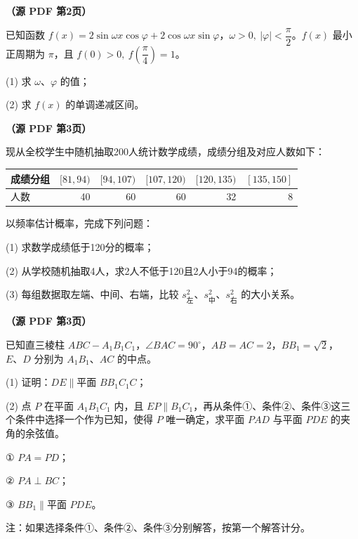 \begin{question}
\textbf{（源 PDF 第2页）} 

已知函数 \(f(x)=2\sin\omega x\cos\varphi+2\cos\omega x\sin\varphi\)，\(\omega>0,\ \lvert\varphi\rvert<\dfrac{\pi}{2}\)。\(f(x)\) 最小正周期为 \(\pi\)，且 \(f(0)>0,\ f\left(\dfrac{\pi}{4}\right)=1\)。

(1) 求 \(\omega\text{、}\varphi\) 的值；

(2) 求 \(f(x)\) 的单调递减区间。

\end{question}
\begin{question}
\textbf{（源 PDF 第3页）} 

现从全校学生中随机抽取200人统计数学成绩，成绩分组及对应人数如下：

\begin{center}
\begin{tabular}{lrrrrr}
\toprule
成绩分组 & \([81,94)\) & \([94,107)\) & \([107,120)\) & \([120,135)\) & \([135,150]\) \\
\midrule
人数 & 40 & 60 & 60 & 32 & 8 \\
\bottomrule
\end{tabular}
\end{center}

以频率估计概率，完成下列问题：

(1) 求数学成绩低于120分的概率；

(2) 从学校随机抽取4人，求2人不低于120且2人小于94的概率；

(3) 每组数据取左端、中间、右端，比较 \(s_{\text{左}}^2\text{、}s_{\text{中}}^2\text{、}s_{\text{右}}^2\) 的大小关系。

\Needspace{0.4\textheight}
\end{question}
\begin{question}
\textbf{（源 PDF 第3页）} 

已知直三棱柱 \(ABC-A_1B_1C_1\)，\(\angle BAC=90^\circ\)，\(AB=AC=2\)，\(BB_1=\sqrt{2}\)，\(E\text{、}D\) 分别为 \(A_1B_1\text{、}AC\) 的中点。
\nopagebreak[4]
\begin{center}\end{center}
\nopagebreak[4]
(1) 证明：\(DE\parallel\)平面 \(BB_1C_1C\)；

(2) 点 \(P\) 在平面 \(A_1B_1C_1\) 内，且 \(EP\parallel B_1C_1\)，再从条件①、条件②、条件③这三个条件中选择一个作为已知，使得 \(P\) 唯一确定，求平面 \(PAD\) 与平面 \(PDE\) 的夹角的余弦值。

① \(PA=PD\)；

② \(PA\perp BC\)；

③ \(BB_1\parallel\)平面 \(PDE\)。

注：如果选择条件①、条件②、条件③分别解答，按第一个解答计分。

\end{question}
